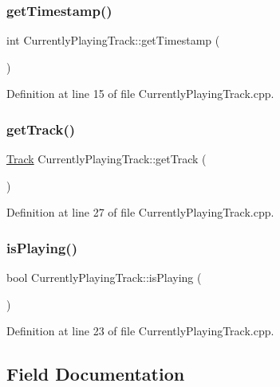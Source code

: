 \subsubsection{\texorpdfstring{get\+Timestamp()}{getTimestamp()}}
{\footnotesize\ttfamily int Currently\+Playing\+Track\+::get\+Timestamp (\begin{DoxyParamCaption}{ }\end{DoxyParamCaption})}



Definition at line 15 of file Currently\+Playing\+Track.\+cpp.

\mbox{\label{class_currently_playing_track_a339e657df2ff1ccb373e31f37dd05c87}} 
\subsubsection{\texorpdfstring{get\+Track()}{getTrack()}}
{\footnotesize\ttfamily \mbox{\hyperlink{class_track}{Track}} Currently\+Playing\+Track\+::get\+Track (\begin{DoxyParamCaption}{ }\end{DoxyParamCaption})}



Definition at line 27 of file Currently\+Playing\+Track.\+cpp.

\mbox{\label{class_currently_playing_track_a5c256c9a9ab797068400e8e14ee0a030}} 
\subsubsection{\texorpdfstring{is\+Playing()}{isPlaying()}}
{\footnotesize\ttfamily bool Currently\+Playing\+Track\+::is\+Playing (\begin{DoxyParamCaption}{ }\end{DoxyParamCaption})}



Definition at line 23 of file Currently\+Playing\+Track.\+cpp.



\subsection{Field Documentation}
\mbox{\label{class_currently_playing_track_accf9a865b5c637b5a5bf3eb39beab142}} 
